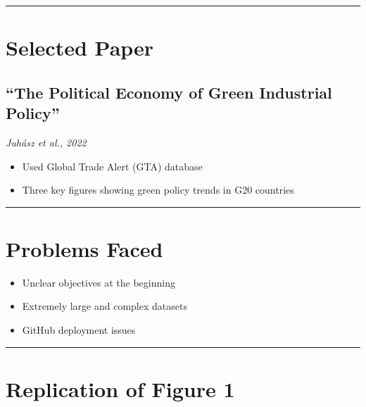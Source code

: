 \documentclass[
  letterpaper,
  DIV=11,
  numbers=noendperiod]{scrartcl}
\providecommand{\tightlist}{%
  \setlength{\itemsep}{0pt}\setlength{\parskip}{0pt}}
\begin{document}
\begin{center}\rule{0.5\linewidth}{0.5pt}\end{center}

\section{Selected Paper}\label{selected-paper}

\subsection{``The Political Economy of Green Industrial
Policy''}\label{the-political-economy-of-green-industrial-policy}

\emph{Juhász et al., 2022}

\begin{itemize}
\tightlist
\item
  Used Global Trade Alert (GTA) database
\item
  Three key figures showing green policy trends in G20 countries
\end{itemize}

\begin{center}\rule{0.5\linewidth}{0.5pt}\end{center}

\section{Problems Faced}\label{problems-faced}

\begin{itemize}
\tightlist
\item
  Unclear objectives at the beginning
\item
  Extremely large and complex datasets
\item
  GitHub deployment issues
\end{itemize}

\begin{center}\rule{0.5\linewidth}{0.5pt}\end{center}

\section{Replication of Figure 1}\label{replication-of-figure-1}
\end{document}
